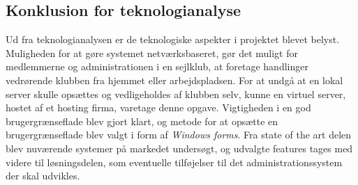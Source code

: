 \subsection{Konklusion for teknologianalyse}

Ud fra teknologianalysen er de teknologiske aspekter i projektet blevet belyst. Muligheden for at gøre
systemet netværksbaseret, gør det muligt for medlemmerne og administrationen i en sejlklub, at foretage
handlinger vedrørende klubben fra hjemmet eller arbejdspladsen. For at undgå at en lokal server skulle
opsættes og vedligeholdes af klubben selv, kunne en virtuel server, hostet af et hosting firma, varetage denne
opgave. Vigtigheden i en god brugergrænseflade blev gjort klart, og metode for at opsætte en brugergrænseflade
blev valgt i form af \textit{Windows forms}. Fra state of the art delen blev nuværende systemer på markedet
undersøgt, og udvalgte features tages med videre til løsningsdelen, som eventuelle tilføjelser til det
administrationssystem der skal udvikles.


